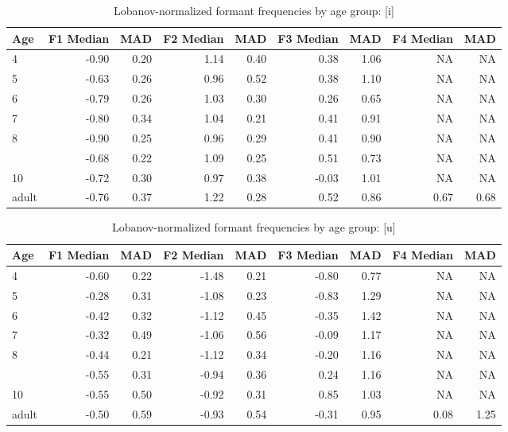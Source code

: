 \documentclass[
]{article}
\begin{document}
\begin{table}[!h]

\caption{\label{tab:lobanov-meas-tbl-i}Lobanov-normalized formant frequencies by age group: [i]}
\centering
\begin{tabular}[t]{lrrrrrrrr}
\toprule
Age & F1 Median & MAD & F2 Median & MAD & F3 Median & MAD & F4 Median & MAD\\
\midrule
4 & -0.90 & 0.20 & 1.14 & 0.40 & 0.38 & 1.06 & NA & NA\\
5 & -0.63 & 0.26 & 0.96 & 0.52 & 0.38 & 1.10 & NA & NA\\
6 & -0.79 & 0.26 & 1.03 & 0.30 & 0.26 & 0.65 & NA & NA\\
7 & -0.80 & 0.34 & 1.04 & 0.21 & 0.41 & 0.91 & NA & NA\\
8 & -0.90 & 0.25 & 0.96 & 0.29 & 0.41 & 0.90 & NA & NA\\
\addlinespace
9 & -0.68 & 0.22 & 1.09 & 0.25 & 0.51 & 0.73 & NA & NA\\
10 & -0.72 & 0.30 & 0.97 & 0.38 & -0.03 & 1.01 & NA & NA\\
adult & -0.76 & 0.37 & 1.22 & 0.28 & 0.52 & 0.86 & 0.67 & 0.68\\
\bottomrule
\end{tabular}
\end{table}

\begin{table}[!h]

\caption{\label{tab:lobanov-meas-tbl-u}Lobanov-normalized formant frequencies by age group: [u]}
\centering
\begin{tabular}[t]{lrrrrrrrr}
\toprule
Age & F1 Median & MAD & F2 Median & MAD & F3 Median & MAD & F4 Median & MAD\\
\midrule
4 & -0.60 & 0.22 & -1.48 & 0.21 & -0.80 & 0.77 & NA & NA\\
5 & -0.28 & 0.31 & -1.08 & 0.23 & -0.83 & 1.29 & NA & NA\\
6 & -0.42 & 0.32 & -1.12 & 0.45 & -0.35 & 1.42 & NA & NA\\
7 & -0.32 & 0.49 & -1.06 & 0.56 & -0.09 & 1.17 & NA & NA\\
8 & -0.44 & 0.21 & -1.12 & 0.34 & -0.20 & 1.16 & NA & NA\\
\addlinespace
9 & -0.55 & 0.31 & -0.94 & 0.36 & 0.24 & 1.16 & NA & NA\\
10 & -0.55 & 0.50 & -0.92 & 0.31 & 0.85 & 1.03 & NA & NA\\
adult & -0.50 & 0.59 & -0.93 & 0.54 & -0.31 & 0.95 & 0.08 & 1.25\\
\bottomrule
\end{tabular}
\end{table}
\end{document}
